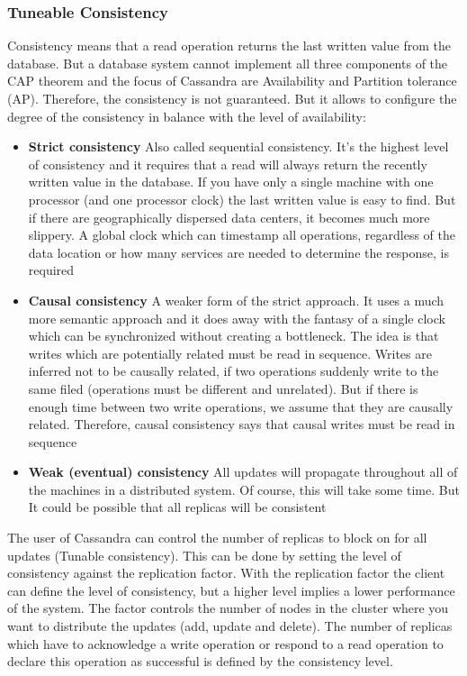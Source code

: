 \documentclass[a4paper]{article}
\begin{document}
\subsubsection{Tuneable Consistency}
Consistency means that a read operation returns the last written value from the database. But a database system cannot implement all three components of the CAP theorem and the focus of Cassandra are Availability and Partition tolerance (AP). Therefore, the consistency is not guaranteed. But it allows to configure the degree of the consistency in balance with the level of availability: 
\begin{itemize}
	\item \textbf{Strict consistency} Also called sequential consistency. It's the highest level of consistency and it requires that a read will always return the recently written value in the database. If you have only a single machine with one processor (and one processor clock) the last written value is easy to find. But if there are geographically dispersed data centers, it becomes much more slippery. A global clock which can timestamp all operations, regardless of the data location or how many services are needed to determine the response, is required 
	\item \textbf{Causal consistency} A weaker form of the strict approach. It uses a much more semantic approach and it does away with the fantasy of a single clock which can be synchronized without creating a bottleneck. The idea is that writes which are potentially related must be read in sequence. Writes are inferred not to be causally related, if two operations suddenly write to the same filed (operations must be different and unrelated). But if there is enough time between two write operations, we assume that they are causally related. Therefore, causal consistency says that causal writes must be read in sequence 
	\item \textbf{Weak (eventual) consistency} All updates will propagate throughout all of the machines in a distributed system. Of course, this will take some time. But It could be possible that all replicas will be consistent 
\end{itemize}
The user of Cassandra can control the number of replicas to block on for all updates (Tunable consistency). This can be done by setting the level of consistency against the replication factor. With the replication factor the client can define the level of consistency, but a higher level implies a lower performance of the system. The factor controls the number of nodes in the cluster where you want to distribute the updates (add, update and delete). The number of replicas which have to acknowledge a write operation or respond to a read operation to declare this operation as successful is defined by the consistency level.
\end{document}

